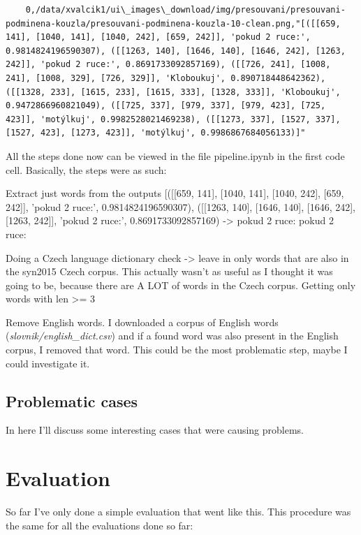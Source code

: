 \documentclass[
  digital,     %
  oneside,     %
  nosansbold,  %
  nocolorbold, %
  nolof,         %
  nolot,         %
]{fithesis4}
\begin{document}
\begin{verbatim}
    0,/data/xvalcik1/ui\_images\_download/img/presouvani/presouvani-podminena-kouzla/presouvani-podminena-kouzla-10-clean.png,"[([[659, 141], [1040, 141], [1040, 242], [659, 242]], 'pokud 2 ruce:', 0.9814824196590307), ([[1263, 140], [1646, 140], [1646, 242], [1263, 242]], 'pokud 2 ruce:', 0.8691733092857169), ([[726, 241], [1008, 241], [1008, 329], [726, 329]], 'Kloboukuj', 0.890718448642362), ([[1328, 233], [1615, 233], [1615, 333], [1328, 333]], 'Kloboukuj', 0.9472866960821049), ([[725, 337], [979, 337], [979, 423], [725, 423]], 'motýlkuj', 0.9982528021469238), ([[1273, 337], [1527, 337], [1527, 423], [1273, 423]], 'motýlkuj', 0.9986867684056133)]"
\end{verbatim}




All the steps done now can be viewed in the file pipeline.ipynb in the first code cell. Basically, the steps were as such:

Extract just words from the outputs [([[659, 141], [1040, 141], [1040, 242], [659, 242]], 'pokud 2 ruce:', 0.9814824196590307), ([[1263, 140], [1646, 140], [1646, 242], [1263, 242]], 'pokud 2 ruce:', 0.8691733092857169) -> pokud 2 ruce: pokud 2 ruce:

Doing a Czech language dictionary check -> leave in only words that are also in the syn2015 Czech corpus. This actually wasn't as useful as I thought it was going to be, because there are A LOT of words in the Czech corpus.
Getting only words with len >= 3

Remove English words. I downloaded a corpus of English words (\emph{slovnik/english\_dict.csv}) and if a found word was also present in the English corpus, I removed that word. This could be the most problematic step, maybe I could investigate it.

\section{Problematic cases}

In here I'll discuss some interesting cases that were causing problems.

\chapter{Evaluation}\label{chap:evaluation}

So far I've only done a simple evaluation that went like this. This procedure was the same for all the evaluations done so far:
\end{document}
